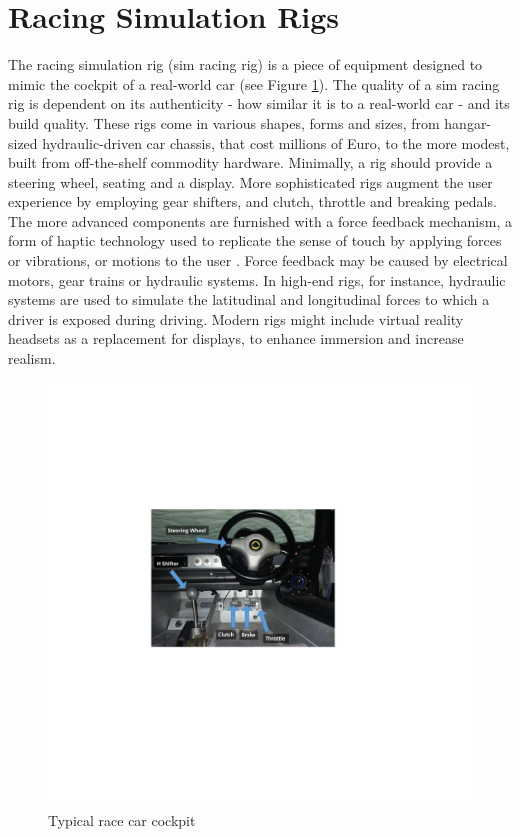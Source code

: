 \section{Racing Simulation Rigs}
The racing simulation rig (sim racing rig) is a piece of equipment designed to mimic the cockpit of a real-world car (see Figure \ref{fig:racecarcockpit}). The quality of a sim racing rig is dependent on its authenticity - how similar it is to a real-world car - and its build quality. These rigs come in various shapes, forms and sizes, from hangar-sized hydraulic-driven car chassis, that cost millions of Euro, to the more modest, built from off-the-shelf commodity hardware. Minimally, a rig should provide a steering wheel, seating and a display. More sophisticated rigs augment the user experience by employing gear shifters, and clutch, throttle and breaking pedals. The more advanced components are furnished with a force feedback mechanism, a form of haptic technology used to replicate the sense of touch by applying forces or vibrations, or motions to the user \cite{li2015can}. Force feedback may be caused by electrical motors, gear trains or hydraulic systems. In high-end rigs, for instance, hydraulic systems are used to simulate the latitudinal and longitudinal forces to which a driver is exposed during driving. Modern rigs might include virtual reality headsets as a replacement for displays, to enhance immersion and increase realism.

\begin{figure}[!htb]
	\centering
	\includegraphics[width=\textwidth]{images/racecarcockpit.pdf}
	\caption{Typical race car cockpit}
	\label{fig:racecarcockpit}
\end{figure}

